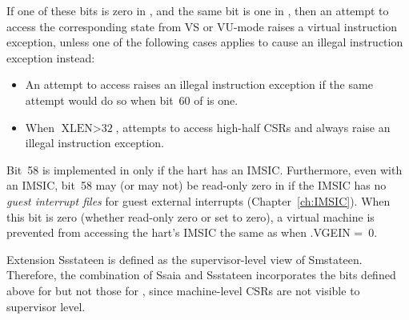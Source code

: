 If one of these bits is zero in ,
and the same bit is one in ,
then an attempt to access the corresponding state
from VS or \mbox{VU-mode} raises a virtual instruction exception,
unless one of the following cases applies
to cause an illegal instruction exception instead:
\begin{itemize}

\item
An attempt to access  raises an illegal instruction exception
if the same attempt would do so when bit~60 of  is one.

\item
When $\mbox{XLEN} > \mbox{32}$, attempts to access high-half CSRs
 and  always raise an illegal instruction exception.

\end{itemize}

Bit~58 is implemented in 
only if the hart has an IMSIC.
Furthermore, even with an IMSIC, bit~58 may (or may not) be read-only
zero in  if
the IMSIC has no \emph{guest interrupt files}
for guest external interrupts (Chapter~\ref{ch:IMSIC}).
When this bit is zero (whether read-only zero or set to zero),
a virtual machine is prevented from
accessing the hart's IMSIC the same as when .VGEIN =~0.

Extension Ssstateen is defined as
the supervisor-level view of Smstateen.
Therefore, the combination of Ssaia and Ssstateen incorporates the bits
defined above for  but not those for ,
since machine-level CSRs are not visible to supervisor level.

